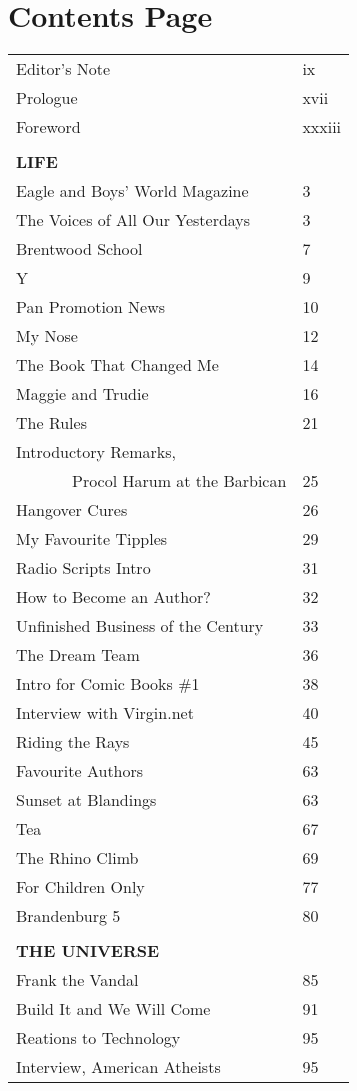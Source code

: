 \documentclass[a4paper,landscape]{article}
\begin{document}
\twocolumn

\section*{Contents Page}
\begin{tabular}{p{6.5cm}| p{1cm}}
Editor's Note & ix\\
Prologue&xvii\\
Foreword&xxxiii\\
\hline
\\
{\bf LIFE}\\
Eagle and Boys' World Magazine &3\\
The Voices of All Our Yesterdays&3\\
Brentwood School&7\\
Y&9\\
Pan Promotion News&10\\
My Nose&12\\
The Book That Changed Me&14\\
Maggie and Trudie&16\\
The Rules&21\\
Introductory Remarks, \\
\ \ \ \ \ \ \ Procol Harum at the Barbican&25\\
Hangover Cures&26\\
My Favourite Tipples&29\\
Radio Scripts Intro&31\\
How to Become an Author?&32\\
Unfinished Business of the Century&33\\
The Dream Team&36\\
Intro for Comic Books \#1&38\\
Interview with Virgin.net&40\\
Riding the Rays&45\\
Favourite Authors&63\\
Sunset at Blandings&63\\
Tea&67\\
The Rhino Climb&69\\
For Children Only&77\\
Brandenburg 5&80\\
\hline
\\
{\bf THE UNIVERSE}\\
Frank the Vandal&85\\
Build It and We Will Come&91\\
Reations to Technology&95\\
Interview, American Atheists&95\\
\end{tabular}
\end{document}
